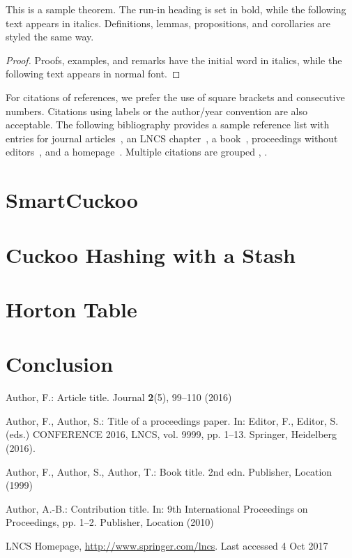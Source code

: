 \documentclass[runningheads]{llncs}
\begin{document}
\begin{theorem}
This is a sample theorem. The run-in heading is set in bold, while
the following text appears in italics. Definitions, lemmas,
propositions, and corollaries are styled the same way.
\end{theorem}
%
%
\begin{proof}
Proofs, examples, and remarks have the initial word in italics,
while the following text appears in normal font.
\end{proof}
For citations of references, we prefer the use of square brackets
and consecutive numbers. Citations using labels or the author/year
convention are also acceptable. The following bibliography provides
a sample reference list with entries for journal
articles~\cite{ref_article1}, an LNCS chapter~\cite{ref_lncs1}, a
book~\cite{ref_book1}, proceedings without editors~\cite{ref_proc1},
and a homepage~\cite{ref_url1}. Multiple citations are grouped
\cite{ref_article1,ref_lncs1,ref_book1},
\cite{ref_article1,ref_book1,ref_proc1,ref_url1}.

\section{SmartCuckoo}
\section{Cuckoo Hashing with a Stash}
\section{Horton Table}
\section{Conclusion}
%
%
%
% 
% 
%
\begin{thebibliography}{8}
Author, F.: Article title. Journal \textbf{2}(5), 99--110 (2016)

Author, F., Author, S.: Title of a proceedings paper. In: Editor,
F., Editor, S. (eds.) CONFERENCE 2016, LNCS, vol. 9999, pp. 1--13.
Springer, Heidelberg (2016). 

Author, F., Author, S., Author, T.: Book title. 2nd edn. Publisher,
Location (1999)

Author, A.-B.: Contribution title. In: 9th International Proceedings
on Proceedings, pp. 1--2. Publisher, Location (2010)

LNCS Homepage, \url{http://www.springer.com/lncs}. Last accessed 4
Oct 2017
\end{thebibliography}
\end{document}
